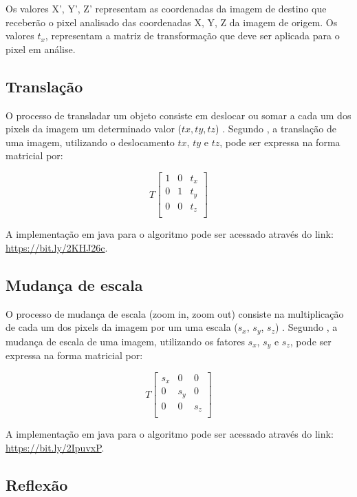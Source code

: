 \documentclass[
	12pt,				%
	oneside,			%
	a4paper,			%
	english,			%
	french,				%
	spanish,			%
	brazil,				%
	]{abntex2}
\begin{document}
Os valores X’, Y’, Z' representam as coordenadas da imagem de destino que receberão o pixel analisado das coordenadas X, Y, Z da imagem de origem. Os valores \(t_x\), representam a matriz de transformação que deve ser aplicada para o pixel em análise.

\subsection{Translação}

O processo de transladar um objeto consiste em deslocar ou somar a cada um dos pixels da imagem um determinado valor (\(tx, ty, tz\)) \cite{conciAzevedoLeta:2008}. Segundo \citet{pedriniSchwartz:2008}, a translação de uma imagem, utilizando o deslocamento \(tx\), \(ty\) e \(tz\), pode ser expressa na forma matricial por:

\[
T
\begin{bmatrix}
    1 & 0 & t_x   \\ 
    0 & 1 & t_y   \\    
    0 & 0 & t_z   \\    
\end{bmatrix} 
\]

A implementação em java para o algoritmo pode ser acessado através do link: \url{https://bit.ly/2KHJ26c}.

\subsection{Mudança de escala}

O processo de mudança de escala (zoom in, zoom out) consiste na multiplicação de cada um dos pixels da imagem por um uma escala (\(s_x\), \(s_y\), \(s_z\))  \cite{conciAzevedoLeta:2008}. Segundo \citet{pedriniSchwartz:2008}, a mudança de escala de uma imagem, utilizando os fatores \(s_x\), \(s_y\) e \(s_z\), pode ser expressa na forma matricial por:

\[
T
\begin{bmatrix}
    s_x & 0   & 0     \\ 
	0   & s_y & 0     \\ 
	0   & 0   & s_z     \\ 
\end{bmatrix} 
\]

A implementação em java para o algoritmo pode ser acessado através do link: \url{https://bit.ly/2IpuvxP}.

\subsection{Reflexão}
\end{document}

